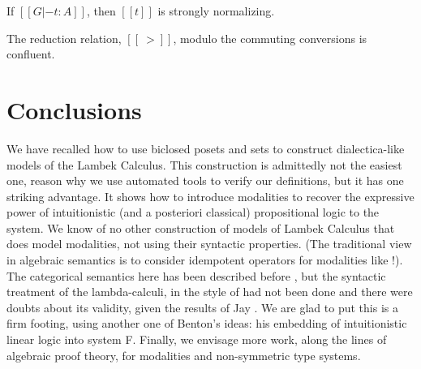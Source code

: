 \documentclass{entcs}
\begin{document}
\begin{thm}
  \label{theorem:strong_normalization_lambdaL!k}
  If $[[G |- t : A]]$, then $[[t]]$ is strongly normalizing.
\end{thm}

\begin{thm}[Confluence]
  \label{thm:confluence-lambdaL!k}
  The reduction relation, $[[~>]]$, modulo the commuting conversions
  is confluent.
\end{thm}


\section{Conclusions}
We have recalled how to use biclosed posets and sets to construct
dialectica-like models of the Lambek Calculus. This construction is
admittedly not the easiest one, reason why we use automated tools to
verify our definitions, but it has one striking advantage. It shows
how to introduce modalities to recover the expressive power of
intuitionistic (and a posteriori classical) propositional logic to the
system. We know of no other construction of models of Lambek Calculus
that does model modalities, not using their syntactic properties. (The
traditional view in algebraic semantics is to consider idempotent
operators for modalities like !). The categorical semantics here has
been described before \cite{depaiva1991}, but the syntactic treatment
of the lambda-calculi, in the style of \cite{benton1993} had not been
done and there were doubts about its validity, given the results of
Jay \cite{jay1991}. We are glad to put this is a firm footing, using
another one of Benton's ideas: his embedding of intuitionistic linear
logic into system F. Finally, we envisage more work, along the lines
of algebraic proof theory, for modalities and non-symmetric type
systems.



\end{document}
